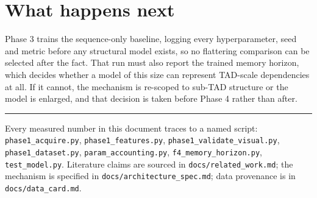 \documentclass[11pt,a4paper]{article}
\newcommand{\code}[1]{\texttt{\small #1}}
\begin{document}
\section{What happens next}

Phase 3 trains the sequence-only baseline, logging every hyperparameter, seed and
metric before any structural model exists, so no flattering comparison can be
selected after the fact. That run must also report the trained memory horizon,
which decides whether a model of this size can represent TAD-scale dependencies
at all. If it cannot, the mechanism is re-scoped to sub-TAD structure or the
model is enlarged, and that decision is taken before Phase 4 rather than after.

\vspace{6mm}
\hrule
\vspace{2mm}
\noindent\small Every measured number in this document traces to a named script:
\code{phase1\_acquire.py}, \code{phase1\_features.py},
\code{phase1\_validate\_visual.py}, \code{phase1\_dataset.py},
\code{param\_accounting.py}, \code{f4\_memory\_horizon.py},
\code{test\_model.py}. Literature claims are sourced in
\code{docs/related\_work.md}; the mechanism is specified in
\code{docs/architecture\_spec.md}; data provenance is in
\code{docs/data\_card.md}.
\end{document}
